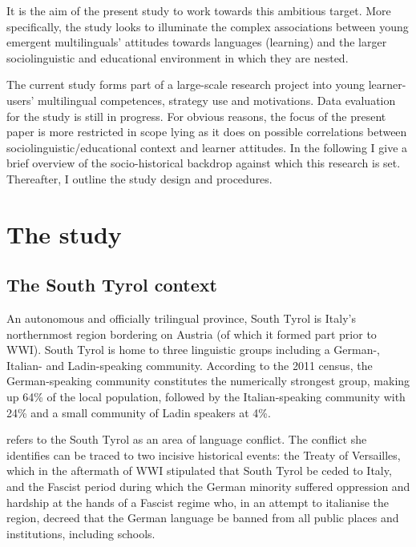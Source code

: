 \documentclass[output=paper]{../langscibook}
\begin{document}
It is the aim of the present study to work towards this ambitious target. More specifically, the study looks to illuminate the complex associations between young emergent multilinguals’ attitudes towards languages (learning) and the larger sociolinguistic and educational environment in which they are nested. 

The current study forms part of a large-scale research project into young learner-users’ multilingual competences, strategy use and motivations. Data evaluation for the study is still in progress. For obvious reasons, the focus of the present paper is more restricted in scope lying as it does on possible correlations between sociolinguistic/educational context and learner attitudes. In the following I give a brief overview of the socio-historical backdrop against which this research is set. Thereafter, I outline the study design and procedures.

 \section{ The study}

 \subsection{The South Tyrol context}


An autonomous and officially trilingual province, South Tyrol is Italy’s northernmost region bordering on Austria (of which it formed part prior to WWI). South Tyrol is home to three linguistic groups including a German-, Italian- and Ladin-speaking community. According to the 2011 census, the German-speaking community constitutes the numerically strongest group, making up 64\% of the local population, followed by the Italian-speaking community with 24\% and a small community of Ladin speakers at 4\%. 

\citet{DeAngelis2012} refers to the South Tyrol as an area of language conflict. The conflict she identifies can be traced to two incisive historical events: the Treaty of Versailles, which in the aftermath of WWI stipulated that South Tyrol be ceded to Italy, and the Fascist period during which the German minority suffered oppression and hardship at the hands of a Fascist regime who, in an attempt to italianise the region, decreed that the German language be banned from all public places and institutions, including schools. 
\end{document}
